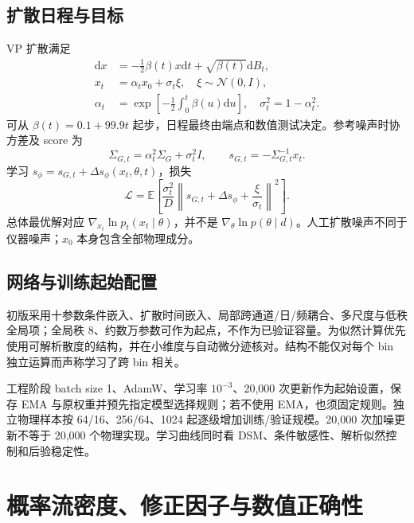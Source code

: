 \documentclass[UTF8,fontset=none,a4paper,11pt]{ctexart}
\newcommand{\dd}{\mathrm d}\newcommand{\GB}{\mathrm{DWD}}\newcommand{\AST}{\mathrm{ast}}\newcommand{\SW}{\mathrm{SW}}
\newcommand{\E}{\mathbb E}\newcommand{\R}{\mathbb R}\newcommand{\tr}{\operatorname{tr}}
\newcommand{\chapterpage}[1]{\section{#1}}
\begin{document}
\subsection{扩散日程与目标}
VP 扩散满足
\begin{align}
\dd x&=-\tfrac12\beta(t)x\dd t+\sqrt{\beta(t)}\dd B_t,\\
x_t&=\alpha_t x_0+\sigma_t\xi,\quad \xi\sim\mathcal N(0,I),\\
\alpha_t&=\exp[-\tfrac12\int_0^t\beta(u)\dd u],\quad \sigma_t^2=1-\alpha_t^2.
\end{align}
可从 $\beta(t)=0.1+99.9t$ 起步，日程最终由端点和数值测试决定。参考噪声时协方差及 score 为
\begin{equation}
\Sigma_{G,t}=\alpha_t^2\Sigma_G+\sigma_t^2I,\qquad s_{G,t}=-\Sigma_{G,t}^{-1}x_t.
\end{equation}
学习 $s_\phi=s_{G,t}+\Delta s_\phi(x_t,\theta,t)$，损失
\begin{equation}
\mathcal L=\E\left[\frac{\sigma_t^2}{D}\left\|s_{G,t}+\Delta s_\phi+\frac{\xi}{\sigma_t}\right\|^2\right].
\end{equation}
总体最优解对应 $\nabla_{x_t}\ln p_t(x_t\mid\theta)$，并不是 $\nabla_\theta\ln p(\theta\mid d)$。人工扩散噪声不同于仪器噪声；$x_0$ 本身包含全部物理成分。
\subsection{网络与训练起始配置}
初版采用十参数条件嵌入、扩散时间嵌入、局部跨通道/日/频耦合、多尺度与低秩全局项；全局秩 8、约数万参数可作为起点，不作为已验证容量。为似然计算优先使用可解析散度的结构，并在小维度与自动微分迹核对。结构不能仅对每个 bin 独立运算而声称学习了跨 bin 相关。
\par 工程阶段 batch size 1、AdamW、学习率 $10^{-3}$、20,000 次更新作为起始设置，保存 EMA 与原权重并预先指定模型选择规则；若不使用 EMA，也须固定规则。独立物理样本按 64/16、256/64、1024 起逐级增加训练/验证规模。20,000 次加噪更新不等于 20,000 个物理实现。学习曲线同时看 DSM、条件敏感性、解析似然控制和后验稳定性。
\chapterpage{概率流密度、修正因子与数值正确性}
\end{document}
